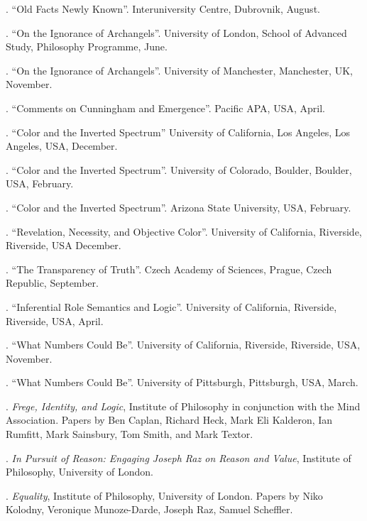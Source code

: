 \documentclass[11pt]{article}
\begin{document}
. ``Old Facts Newly Known''. Interuniversity Centre, Dubrovnik, August.

. ``On the Ignorance of Archangels''. University of London, School of Advanced Study, Philosophy Programme, June.

. ``On the Ignorance of Archangels''. University of Manchester, Manchester, UK, November.

. ``Comments on Cunningham and Emergence''. Pacific APA, USA, April.

. ``Color and the Inverted Spectrum'' University of California, Los Angeles, Los Angeles, USA, December.

. ``Color and the Inverted Spectrum''. University of Colorado, Boulder, Boulder, USA, February.

. ``Color and the Inverted Spectrum''. Arizona State University, USA, February.

. ``Revelation, Necessity, and Objective Color''. University of California, Riverside, Riverside, USA December.

. ``The Transparency of Truth''. Czech Academy of Sciences, Prague, Czech Republic, September.

. ``Inferential Role Semantics and Logic''. University of California, Riverside, Riverside, USA, April.

. ``What Numbers Could Be''. University of California, Riverside, Riverside, USA, November.

. ``What Numbers Could Be''. University of Pittsburgh, Pittsburgh, USA, March.



\bigskip

\medskip

. \emph{Frege, Identity, and Logic}, Institute of Philosophy in conjunction with the Mind Association. Papers by Ben Caplan, Richard Heck, Mark Eli Kalderon, Ian Rumfitt, Mark Sainsbury, Tom Smith, and Mark Textor.

. \emph{In Pursuit of Reason: Engaging Joseph Raz on Reason and Value}, Institute of Philosophy, University of London.

. \emph{Equality}, Institute of Philosophy, University of London. Papers by Niko Kolodny, Veronique Munoze-Darde, Joseph Raz, Samuel Scheffler.

\bigskip
\end{document}
